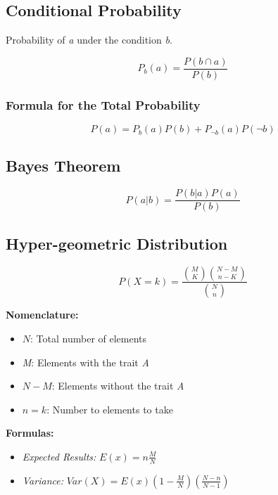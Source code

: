 \subsection{Conditional Probability}

Probability of \emph{a} under the condition \emph{b}.

\[
    P_b (a) = \frac{P(b \cap a)}{P(b)}
\]

\subsubsection{Formula for the Total Probability}

\[
    P(a) = P_b (a) P(b) + P_{\neg b}(a) P(\neg b)
\]

\subsection{Bayes Theorem}

\[
    P(a | b) = \frac{P(b | a) P(a)}{P(b)}
\]

\subsection{Hyper-geometric Distribution}

\[
    P(X = k) = \frac{\binom{M}{K} \binom{N - M}{n - K}}{\binom{N}{n}}
\]

\textbf{Nomenclature:}

\begin{itemize}

    \item \(N\): Total number of elements

    \item \emph{M}: Elements with the trait \emph{A}

    \item \(N - M\): Elements without the trait \emph{A}

    \item \(n = k\): Number to elements to take

\end{itemize}

\textbf{Formulas:}

\begin{itemize}

    \item \emph{Expected Results: } \(E(x) = n \frac{M}{N}\)

    \item \emph{Variance: } \(Var(X) = E(x)\left(1 - \frac{M}{N}\right) \left(\frac{N - n}{N - 1}\right)\)

\end{itemize}

